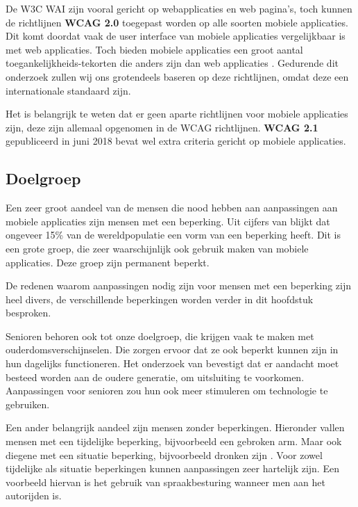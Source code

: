De W3C WAI zijn vooral gericht op webapplicaties en web pagina's, toch kunnen de richtlijnen \textbf{WCAG 2.0} toegepast worden op alle soorten mobiele applicaties. Dit komt doordat vaak de user interface van mobiele applicaties vergelijkbaar is met web applicaties. Toch bieden mobiele applicaties een groot aantal toegankelijkheids-tekorten die anders zijn dan web applicaties \autocite{w3mobileConsider}. Gedurende dit onderzoek zullen wij ons grotendeels baseren op deze richtlijnen, omdat deze een internationale standaard zijn.

Het is belangrijk te weten dat er geen aparte richtlijnen voor mobiele applicaties zijn, deze zijn allemaal opgenomen in de WCAG richtlijnen. \textbf{WCAG 2.1} gepubliceerd in juni 2018 bevat wel extra criteria gericht op mobiele applicaties.
\autocite{w3cMobileGuidelines}

\subsection{Doelgroep}
\label{sec:doelgroep}

Een zeer groot aandeel van de mensen die nood hebben aan aanpassingen aan mobiele applicaties zijn mensen met een beperking.  Uit cijfers van \cite{who2018} blijkt dat ongeveer 15\% van de wereldpopulatie  een vorm van een beperking heeft. Dit is een grote groep, die zeer waarschijnlijk ook gebruik maken van mobiele applicaties. Deze groep zijn permanent beperkt.

De redenen waarom aanpassingen nodig zijn voor mensen met een beperking zijn heel divers, de verschillende beperkingen worden verder in dit hoofdstuk besproken.

Senioren behoren ook tot onze doelgroep, die krijgen vaak te maken met ouderdomsverschijnselen. Die zorgen ervoor dat ze ook beperkt kunnen zijn in hun dagelijks functioneren. Het onderzoek van \cite{diaz2014accessibility} bevestigt dat er aandacht moet besteed worden aan de oudere generatie, om uitsluiting te voorkomen. Aanpassingen voor senioren zou hun ook meer stimuleren om technologie te gebruiken.


Een ander belangrijk aandeel zijn mensen zonder beperkingen. Hieronder vallen mensen met een tijdelijke beperking, bijvoorbeeld een gebroken arm. Maar ook diegene met een situatie beperking, bijvoorbeeld dronken zijn \autocite{inclusiveMicrosoft}. Voor zowel tijdelijke als situatie beperkingen kunnen aanpassingen zeer hartelijk zijn.  Een voorbeeld hiervan is het gebruik van spraakbesturing wanneer men aan het autorijden is.

